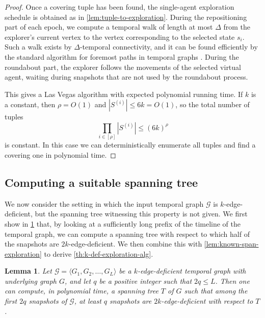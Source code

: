 \documentclass[a4paper,11pt]{article}
\newtheorem{lemma}[theorem]{Lemma}
\theoremstyle{definition}
\theoremstyle{remark}
\newcommand{\cG}{\ensuremath{\mathcal{G}}}
\begin{document}
\begin{proof}
        Once a covering tuple has been found, the single-agent exploration schedule is obtained as in \cref{lem:tuple-to-exploration}. During the repositioning part of each epoch, we compute a temporal walk of length at most $\Delta$ from the explorer's current vertex to the vertex corresponding to the selected state $s_i$.
        Such a walk exists by $\Delta$-temporal connectivity, and it can be found efficiently by the standard algorithm for foremost paths in temporal graphs \cite{XFJ03}. During the roundabout part, the explorer follows the movements of the selected virtual agent, waiting during snapshots that are not used by the roundabout process.

        This gives a Las Vegas algorithm with expected polynomial running time. If $k$ is a constant, then $\rho=O(1)$ and $|S^{(i)}|\leq 6k=O(1)$, so the total number of tuples
        \[
            \prod_{i\in[\rho]} |S^{(i)}|
            \leq
            (6k)^\rho
        \]
        is constant. In this case we can deterministically enumerate all tuples and find a covering one in polynomial time.
    \end{proof}

    \subsection{Computing a suitable spanning tree}
    \label{subsec:efficient-finding-tree}

    We now consider the setting in which the input temporal graph $\cG$ is $k$-edge-deficient, but the spanning tree witnessing this property is not given. We first show in \cref{lem:find-good-tree} that, by looking at a sufficiently long prefix of the timeline of the temporal graph, we can compute a spanning tree with respect to which half of the snapshots are $2k$-edge-deficient. We then combine this with \cref{lem:known-span-exploration} to derive \cref{th:k-def-exploration-alg}.

    \begin{lemma}\label{lem:find-good-tree}
        Let $\cG=\langle G_1,G_2,\dots,G_L\rangle$ be a $k$-edge-deficient temporal graph with underlying graph $G$, and let $q$ be a positive integer such that $2q\leq L$. Then one can compute, in polynomial time, a spanning tree $T$ of $G$ such that among the first $2q$ snapshots of $\cG$, at least $q$ snapshots are $2k$-edge-deficient with respect to $T$.
    \end{lemma}
\end{document}
